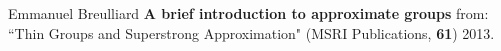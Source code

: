 \documentclass[12pt]{article}
\begin{document}
\vfill

\begin{thebibliography}{}

\item Emmanuel Breulliard \textbf{A brief introduction to approximate groups} from: ``Thin Groups and Superstrong Approximation" (MSRI Publications, \textbf{61}) 2013.

\end{thebibliography}
\end{document}
